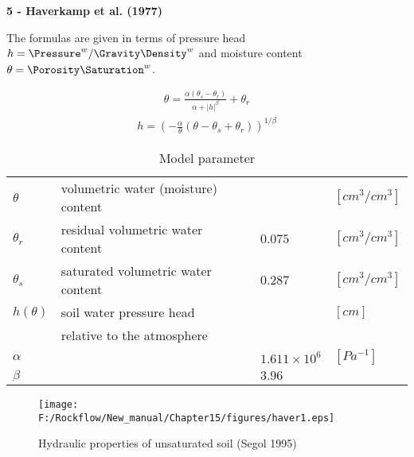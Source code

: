 \textbf{5 - Haverkamp et al. (1977)}

\vspace{5mm}

The formulas are given in terms of pressure head
$h=\Pressure^w/\Gravity\Density^w$
and moisture content
$\theta=\Porosity\Saturation^w$.

\begin{eqnarray}
\theta = \frac{\alpha(\theta_s-\theta_r)}{\alpha+|h|^\beta} +
\theta_r
\end{eqnarray}
\begin{eqnarray}
h = \left( -\frac{\alpha}{\theta} (\theta - \theta_s + \theta_r)
\right)^{1/\beta}
\end{eqnarray}

%
\begin{table}[htb!]
\caption{Model parameter}
\begin{center}
\begin{tabular}{|l|l|l|l|}
\hline
$\theta$    & volumetric water (moisture) content &         & $[cm^3/cm^3]$ \\
$\theta_r$  & residual volumetric water content   & $0.075$ & $[cm^3/cm^3]$ \\
$\theta_s$  & saturated volumetric water content  & $0.287$ & $[cm^3/cm^3]$ \\
$h(\theta)$ & soil water pressure head            &         & $[cm]$ \\
            & relative to the atmosphere          &         & \\
$\alpha$    &                                     & $1.611\times 10^6$ & $[Pa^{-1}]$ \\
$\beta$     &                                     & $3.96$ & \\
\hline
\end{tabular}
\end{center}
\end{table}
%

\begin{figure}[htb!]
\begin{center}
\footnotesize
\texttt{[image: F:/Rockflow/New\_manual/Chapter15/figures/haver1.eps]}  %
\caption{Hydraulic properties of unsaturated soil (Segol 1995)}
\label{fig:}
\end{center}
\end{figure}
\vspace{5mm}
%



